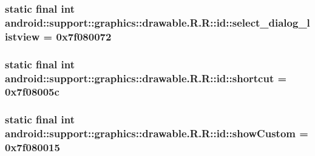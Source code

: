 \hypertarget{classandroid_1_1support_1_1graphics_1_1drawable_1_1_r_1_1id_effa3aa2931f1b2e8df6c67f3b1d3ca4}{
\subsubsection[{select\_\-dialog\_\-listview}]{\setlength{\rightskip}{0pt plus 5cm}static final int android::support::graphics::drawable.R.R::id::select\_\-dialog\_\-listview = 0x7f080072}}
\label{classandroid_1_1support_1_1graphics_1_1drawable_1_1_r_1_1id_effa3aa2931f1b2e8df6c67f3b1d3ca4}


\hypertarget{classandroid_1_1support_1_1graphics_1_1drawable_1_1_r_1_1id_50c8c73cb6ef6fe0244b3cf86a51fa5e}{
\subsubsection[{shortcut}]{\setlength{\rightskip}{0pt plus 5cm}static final int android::support::graphics::drawable.R.R::id::shortcut = 0x7f08005c}}
\label{classandroid_1_1support_1_1graphics_1_1drawable_1_1_r_1_1id_50c8c73cb6ef6fe0244b3cf86a51fa5e}


\hypertarget{classandroid_1_1support_1_1graphics_1_1drawable_1_1_r_1_1id_d7d6cde1f6aa40b0253f729b6cd5b905}{
\subsubsection[{showCustom}]{\setlength{\rightskip}{0pt plus 5cm}static final int android::support::graphics::drawable.R.R::id::showCustom = 0x7f080015}}
\label{classandroid_1_1support_1_1graphics_1_1drawable_1_1_r_1_1id_d7d6cde1f6aa40b0253f729b6cd5b905}


